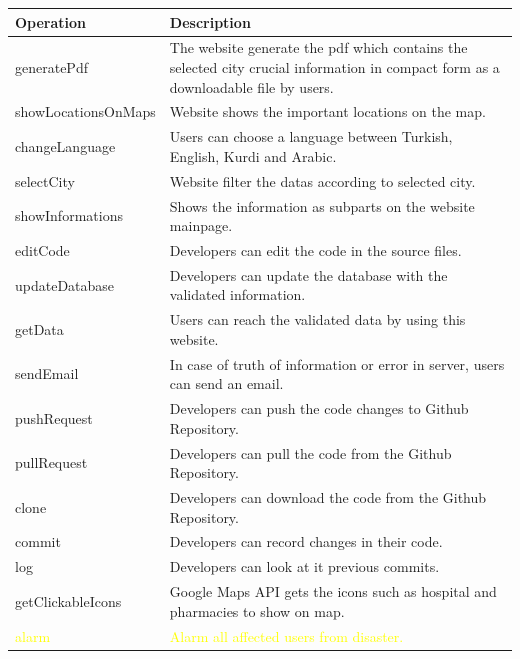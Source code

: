 \begin{center}
    \begin{table}[H]
        \begin{tabular}{| m{6cm}| m{8cm} |}
            \hline
            \textbf{Operation} & \textbf{Description} \\
            \hline
            generatePdf & The website generate the pdf which contains the selected city crucial information in compact form as a downloadable file by users.\\
            \hline
            showLocationsOnMaps & Website shows the important locations on the map.\\
            \hline
            changeLanguage & Users can choose a language between Turkish, English, Kurdi and Arabic.\\
            \hline
            selectCity & Website filter the datas according to selected city.\\
            \hline
            showInformations & Shows the information as subparts on the website mainpage.\\
            \hline
            editCode & Developers can edit the code in the source files.\\
            \hline
            updateDatabase & Developers can update the database with the validated information.\\
            \hline
            getData & Users can reach the validated data by using this website.\\
            \hline
            sendEmail & In case of truth of information or error in server, users can send an email.\\
            \hline
            pushRequest & Developers can push the code changes to Github Repository.\\
            \hline
            pullRequest & Developers can pull the code from the Github Repository.\\
            \hline
            clone & Developers can download the code from the Github Repository.\\
            \hline
            commit & Developers can record changes in their code.\\
            \hline
            log & Developers can look at it previous commits.\\
            \hline
            getClickableIcons & Google Maps API gets the icons such as hospital and pharmacies to show on map.\\
            \hline
            \textcolor{yellow}{alarm} & \textcolor{yellow}{Alarm all affected users from disaster.} \\

\end{tabular}
\end{table}
\end{center}
